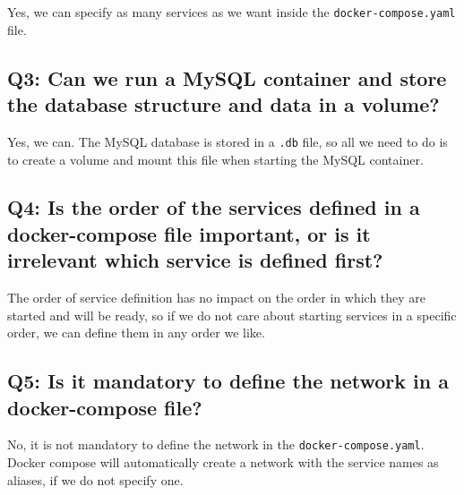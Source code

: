 \documentclass[
]{article}
\begin{document}
Yes, we can specify as many services as we want inside the
\texttt{docker-compose.yaml} file.

\hypertarget{q3-can-we-run-a-mysql-container-and-store-the-database-structure-and-data-in-a-volume}{%
\subsection{Q3: Can we run a MySQL container and store the database
structure and data in a
volume?}\label{q3-can-we-run-a-mysql-container-and-store-the-database-structure-and-data-in-a-volume}}

Yes, we can. The MySQL database is stored in a \texttt{.db} file, so all
we need to do is to create a volume and mount this file when starting
the MySQL container.

\hypertarget{q4-is-the-order-of-the-services-defined-in-a-docker-compose-file-important-or-is-it-irrelevant-which-service-is-defined-first}{%
\subsection{Q4: Is the order of the services defined in a docker-compose
file important, or is it irrelevant which service is defined
first?}\label{q4-is-the-order-of-the-services-defined-in-a-docker-compose-file-important-or-is-it-irrelevant-which-service-is-defined-first}}

The order of service definition has no impact on the order in which they
are started and will be ready, so if we do not care about starting
services in a specific order, we can define them in any order we like.

\hypertarget{q5-is-it-mandatory-to-define-the-network-in-a-docker-compose-file}{%
\subsection{Q5: Is it mandatory to define the network in a
docker-compose
file?}\label{q5-is-it-mandatory-to-define-the-network-in-a-docker-compose-file}}

No, it is not mandatory to define the network in the
\texttt{docker-compose.yaml}. Docker compose will automatically create a
network with the service names as aliases, if we do not specify one.
\end{document}
